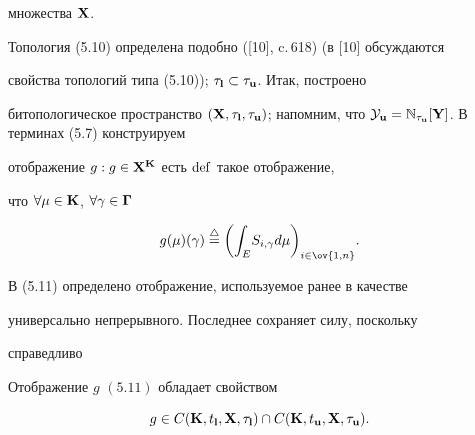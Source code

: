 множества ${\bold X}$.


Топология (5.10) определена подобно ([10], c.\,618) (в [10] обсуждаются


свойства топологий типа (5.10)); ${{\tau}_{\bold l}}


\subset {{\tau}_{\bold u}}$. Итак, построено


битопологическое пространство $({\bold X},{{\tau}_{\bold l}},


{{\tau}_{\bold u}})$; напомним, что ${{\cal Y}_{\bold u}} =


{{\Bbb N}_{{\tau}_{\bold u}}}[{\bold Y}]$. В терминах (5.7) конструируем


отображение $g:g \in {{\bold X}^{\bold K}}$ есть $\operatorname{def}$ такое отображение,


что $\forall{\mu} \in {\bold K}$, $\forall{\gamma} \in \boldsymbol \Gamma$


\begin{equation}


g(\mu)(\gamma) \stac \bigg({\int_E}{S_{i,\gamma}}{d\mu}


\bigg)_{i \in \ov{1,n}}.


\end{equation}





В (5.11) определено отображение, используемое ранее в качестве


универсально непрерывного. Последнее сохраняет силу, поскольку


справедливо





\begin{props}


Отображение $g$ $(5.11)$ обладает свойством


$$


g \in C({\bold K},{t_{\bold l}},


{\bold X},{{\tau}_{\bold l}}) \cap


C({\bold K},{t_{\bold u}},{\bold X},{{\tau}_{\bold u}}).


$$


\end{props}





